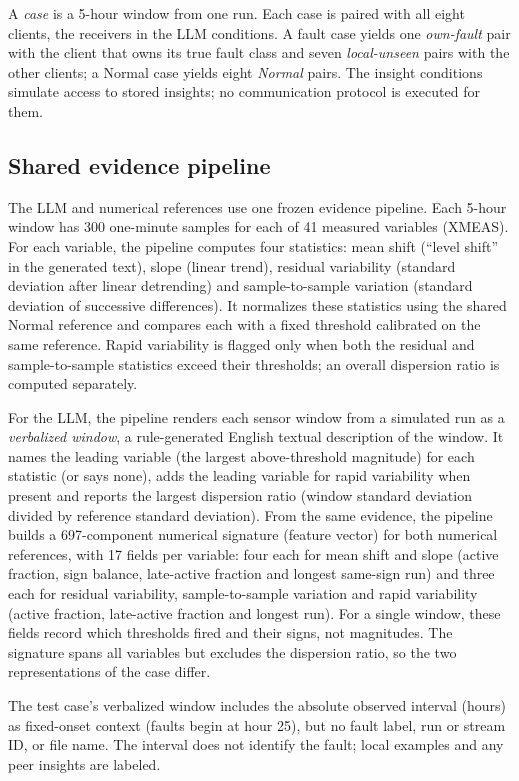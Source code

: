 \documentclass[conference]{IEEEtran}
\newcommand{\lu}{local-unseen}
\begin{document}
A \emph{case} is a 5-hour window from one run. Each case is paired with all eight clients, the receivers in the LLM conditions. A fault case yields one \emph{own-fault} pair with the client that owns its true fault class and seven \emph{\lu} pairs with the other clients; a Normal case yields eight \emph{Normal} pairs. The insight conditions simulate access to stored insights; no communication protocol is executed for them.

\subsection{Shared evidence pipeline}
The LLM and numerical references use one frozen evidence pipeline. Each 5-hour window has 300 one-minute samples for each of 41 measured variables (XMEAS). For each variable, the pipeline computes four statistics: mean shift (``level shift'' in the generated text), slope (linear trend), residual variability (standard deviation after linear detrending) and sample-to-sample variation (standard deviation of successive differences). It normalizes these statistics using the shared Normal reference and compares each with a fixed threshold calibrated on the same reference. Rapid variability is flagged only when both the residual and sample-to-sample statistics exceed their thresholds; an overall dispersion ratio is computed separately.

For the LLM, the pipeline renders each sensor window from a simulated run as a \emph{verbalized window}, a rule-generated English textual description of the window. It names the leading variable (the largest above-threshold magnitude) for each statistic (or says none), adds the leading variable for rapid variability when present and reports the largest dispersion ratio (window standard deviation divided by reference standard deviation). From the same evidence, the pipeline builds a 697-component numerical signature (feature vector) for both numerical references, with 17 fields per variable: four each for mean shift and slope (active fraction, sign balance, late-active fraction and longest same-sign run) and three each for residual variability, sample-to-sample variation and rapid variability (active fraction, late-active fraction and longest run). For a single window, these fields record which thresholds fired and their signs, not magnitudes. The signature spans all variables but excludes the dispersion ratio, so the two representations of the case differ.

The test case's verbalized window includes the absolute observed interval (hours) as fixed-onset context (faults begin at hour 25), but no fault label, run or stream ID, or file name. The interval does not identify the fault; local examples and any peer insights are labeled.
\end{document}
